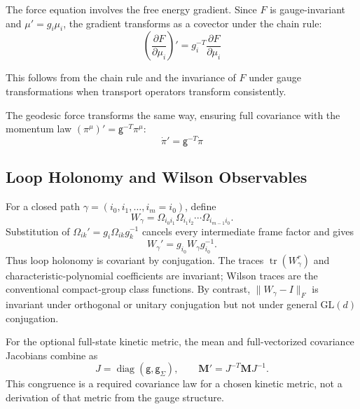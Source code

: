 \documentclass[12pt]{article}
\begin{document}
The force equation involves the free energy gradient. Since $F$ is gauge-invariant and $\mu' = g_i\mu_i$, the gradient transforms as a covector under the chain rule:
\begin{equation}
\left(\frac{\partial F}{\partial\mu_i}\right)' = g_i^{-T} \frac{\partial F}{\partial\mu_i}
\end{equation}

This follows from the chain rule and the invariance of $F$ under gauge transformations when transport operators transform consistently.

The geodesic force transforms the same way, ensuring full covariance with the momentum law $(\pi^\mu)'=\mathsf g^{-T}\pi^\mu$:
\begin{equation}
\boxed{\dot{\pi}'=\mathsf g^{-T}\dot{\pi}}
\end{equation}

\subsection{Loop Holonomy and Wilson Observables}

For a closed path $\gamma=(i_0,i_1,\ldots,i_m=i_0)$, define
\begin{equation}
W_\gamma
=\Omega_{i_0i_1}\Omega_{i_1i_2}\cdots\Omega_{i_{m-1}i_0}.
\end{equation}
Substitution of $\Omega_{ik}'=g_i\Omega_{ik}g_k^{-1}$ cancels every intermediate frame factor and gives
\begin{equation}
W_\gamma'=g_{i_0}W_\gamma g_{i_0}^{-1}.
\end{equation}
Thus loop holonomy is covariant by conjugation. The traces $\operatorname{tr}(W_\gamma^r)$ and characteristic-polynomial coefficients are invariant; Wilson traces are the conventional compact-group class functions. By contrast, $\|W_\gamma-I\|_F$ is invariant under orthogonal or unitary conjugation but not under general $\mathrm{GL}(d)$ conjugation.

For the optional full-state kinetic metric, the mean and full-vectorized covariance Jacobians combine as
\begin{equation}
J=\operatorname{diag}(\mathsf g,\mathsf g_\Sigma),
\qquad
\boxed{\mathbf M'=J^{-T}\mathbf M J^{-1}.}
\label{eq:full_state_kinetic_congruence}
\end{equation}
This congruence is a required covariance law for a chosen kinetic metric, not a derivation of that metric from the gauge structure.
\end{document}
